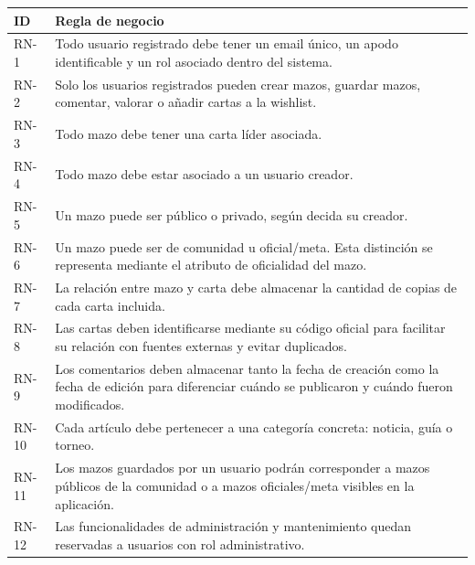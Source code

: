 \documentclass[10pt]{article}
\begin{document}
            \noindent
            \begin{xltabular}{\textwidth}{|l|X|}
                \hline
                 \textbf{ID} & \textbf{Regla de negocio} \\ \hline
                
                RN-1 & Todo usuario registrado debe tener un email único, un apodo identificable y un rol asociado dentro del sistema. \\ \hline
                RN-2 & Solo los usuarios registrados pueden crear mazos, guardar mazos, comentar, valorar o añadir cartas a la wishlist. \\ \hline
                RN-3 & Todo mazo debe tener una carta líder asociada. \\ \hline
                RN-4 & Todo mazo debe estar asociado a un usuario creador. \\ \hline
                RN-5 & Un mazo puede ser público o privado, según decida su creador. \\ \hline
                RN-6 & Un mazo puede ser de comunidad u oficial/meta. Esta distinción se representa mediante el atributo de oficialidad del mazo. \\ \hline
                RN-7 & La relación entre mazo y carta debe almacenar la cantidad de copias de cada carta incluida. \\ \hline
                RN-8 & Las cartas deben identificarse mediante su código oficial para facilitar su relación con fuentes externas y evitar duplicados. \\ \hline
                RN-9 & Los comentarios deben almacenar tanto la fecha de creación como la fecha de edición para diferenciar cuándo se publicaron y cuándo fueron modificados. \\ \hline
                RN-10 & Cada artículo debe pertenecer a una categoría concreta: noticia, guía o torneo. \\ \hline
                RN-11 & Los mazos guardados por un usuario podrán corresponder a mazos públicos de la comunidad o a mazos oficiales/meta visibles en la aplicación. \\ \hline
                RN-12 & Las funcionalidades de administración y mantenimiento quedan reservadas a usuarios con rol administrativo. \\ \hline
                
            \end{xltabular}

    \newpage
\end{document}
